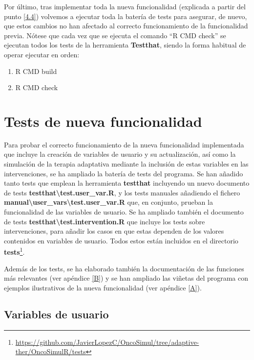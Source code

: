Por último, tras implementar toda la nueva funcionalidad (explicada a partir del punto \ref{4.4}) volvemos a ejecutar toda la batería de tests  para asegurar, de nuevo, que estos cambios no han afectado al correcto funcionamiento de la funcionalidad previa. Nótese que cada vez que se ejecuta el comando ``R CMD check'' se ejecutan todos los tests de la herramienta \textbf{Testthat}\cite{Testthat}, siendo la forma habitual de operar ejecutar en orden:
\begin{enumerate}
	\item R CMD build
	\item R CMD check
\end{enumerate}

\section{Tests de nueva funcionalidad}\label{5.2}

Para probar el correcto funcionamiento de la nueva funcionalidad implementada que incluye la creación de variables de usuario y su actualización, así como la simulación de la terapia adaptativa mediante la inclusión de estas variables en las intervenciones, se ha ampliado la batería de tests del programa. Se han añadido tanto tests que emplean la herramienta \textbf{testthat}\cite{Testthat} incluyendo un nuevo documento de tests \textbf{testthat\textbackslash test.user\_var.R}, y los tests manuales añadiendo el fichero \textbf{manual\textbackslash user\_vars\textbackslash test.user\_var.R} que, en conjunto, prueban la funcionalidad de las variables de usuario. Se ha ampliado también el documento de tests \textbf{testthat\textbackslash test.intervention.R} que incluye los tests sobre intervenciones, para añadir los casos en que estas dependen de los valores contenidos en variables de usuario. Todos estos están incluidos en el directorio \textbf{tests}\footnote{\url{https://github.com/JavierLopezC/OncoSimul/tree/adaptive-ther/OncoSimulR/tests}}. 

Además de los tests, se ha elaborado también la documentación de las funciones más relevantes (ver apéndice \ref{B}) y se han ampliado las viñetas del programa con ejemplos ilustrativos de la nueva funcionalidad (ver apéndice \ref{A}).
\subsection{Variables de usuario}\label{5.2.1}


